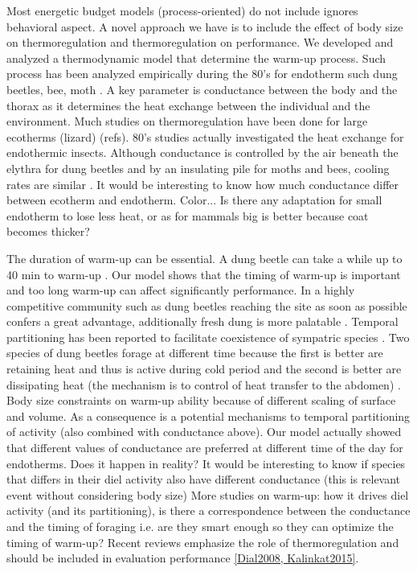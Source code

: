 Most energetic budget models (process-oriented) do not include ignores behavioral aspect.
A novel approach we have is to include the effect of body size on thermoregulation and thermoregulation on performance.
We developed and analyzed a thermodynamic model that determine the warm-up process.
Such process has been analyzed empirically during the 80's  for endotherm  such dung beetles, bee, moth \citep{Heinrich1975, Bartholomew1978, Bartholomew1981}.
A key parameter is conductance between the body and the thorax as it determines the heat exchange between the individual and the environment.
Much studies on thermoregulation have been done for large ecotherms (lizard) (refs).
80's studies actually investigated the heat exchange for endothermic insects.
Although conductance is controlled by the air beneath the elythra for dung beetles and by an insulating pile for moths and bees, cooling rates are similar \citep{Bartholomew1978}.  
It would be interesting to know  how much conductance differ between ecotherm and endotherm.
Color...
Is there any adaptation for small endotherm to lose less heat, or as for mammals big is better because coat becomes thicker?

The duration of warm-up can be essential.
A dung beetle can take a while up to 40 min to warm-up \citep{Verdu2008}.
Our  model shows that the timing of warm-up is important and too long warm-up can affect significantly performance.
In a highly competitive community such as dung beetles reaching the site as soon as possible confers a great advantage, additionally fresh dung is more palatable \citep{Hanski1991}.
Temporal partitioning has been reported to facilitate coexistence of sympatric species \citep{Verdu2007, Verdu2012}.
Two species of dung beetles forage at different time because the first is better are retaining heat and thus is active during cold period and the second is better are dissipating heat (the mechanism is to control of heat transfer to the abdomen) \citep{Verdu2012}.
Body size constraints on warm-up ability because of different scaling of surface and volume.
As a consequence is a potential mechanisms to temporal partitioning of activity (also combined with conductance above).
Our model actually showed that different values of conductance are preferred at different time of the day for endotherms.
Does it happen in reality? %
It would be interesting to know if species that differs in their diel activity also have different conductance (this is relevant event without considering body size)  
More studies on warm-up: how it drives diel activity (and its partitioning), is there a correspondence between the conductance and the timing of foraging i.e. are they smart enough so they can optimize the timing of warm-up? 
Recent reviews emphasize the role of thermoregulation and should be included in evaluation performance \cref{Dial2008, Kalinkat2015}.


